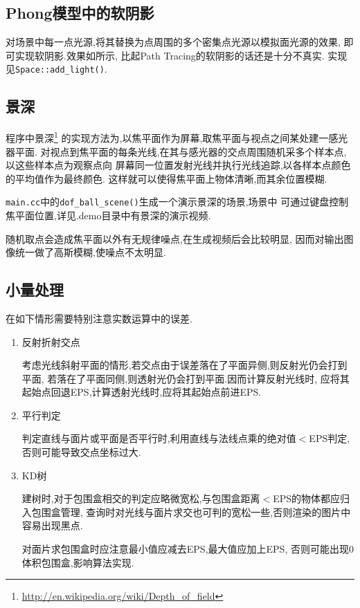 \subsection{Phong模型中的软阴影}
\label{sec:soft}
对场景中每一点光源,将其替换为点周围的多个密集点光源以模拟面光源的效果,
即可实现软阴影.效果如所示, 比起Path Tracing的软阴影的话还是十分不真实. 实现见\verb|Space::add_light()|.

\subsection{景深}
程序中景深\footnote{\url{http://en.wikipedia.org/wiki/Depth\_of\_field}}
的实现方法为,以焦平面作为屏幕,取焦平面与视点之间某处建一感光器平面.
对视点到焦平面的每条光线,在其与感光器的交点周围随机采多个样本点,以这些样本点为观察点向
屏幕同一位置发射光线并执行光线追踪,以各样本点颜色的平均值作为最终颜色.
这样就可以使得焦平面上物体清晰,而其余位置模糊.


\verb|main.cc|中的\verb|dof_ball_scene()|生成一个演示景深的场景,场景中
可通过键盘控制焦平面位置,详见.demo目录中有景深的演示视频.

随机取点会造成焦平面以外有无规律噪点,在生成视频后会比较明显,
因而对输出图像统一做了高斯模糊,使噪点不太明显.

\subsection{小量处理}
在如下情形需要特别注意实数运算中的误差.
\begin{enumerate}
  \item 反射折射交点

    考虑光线斜射平面的情形,若交点由于误差落在了平面异侧,则反射光仍会打到平面,
    若落在了平面同侧,则透射光仍会打到平面.因而计算反射光线时,
    应将其起始点回退EPS,计算透射光线时,应将其起始点前进EPS.

  \item 平行判定

    判定直线与面片或平面是否平行时,利用直线与法线点乘的绝对值$<$EPS判定,
    否则可能导致交点坐标过大.

  \item KD树

    建树时,对于包围盒相交的判定应略微宽松,与包围盒距离$<$EPS的物体都应归入包围盒管理,
    查询时对光线与面片求交也可判的宽松一些,否则渲染的图片中容易出现黑点.

    对面片求包围盒时应注意最小值应减去EPS,最大值应加上EPS,
    否则可能出现0体积包围盒,影响算法实现.
\end{enumerate}

